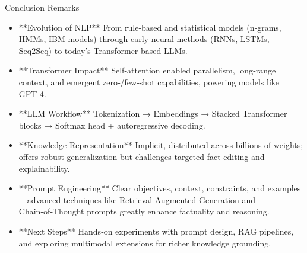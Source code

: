 \documentclass[german,10pt]{beamer}
\begin{document}
\begin{frame}{Conclusion Remarks}
  \begin{itemize}
    \item **Evolution of NLP**  
      From rule‑based and statistical models (n‑grams, HMMs, IBM models) through early neural methods (RNNs, LSTMs, Seq2Seq) to today’s Transformer‑based LLMs.
    \item **Transformer Impact**  
      Self‑attention enabled parallelism, long‑range context, and emergent zero‑/few‑shot capabilities, powering models like GPT‑4.
    \item **LLM Workflow**  
      Tokenization → Embeddings → Stacked Transformer blocks → Softmax head + autoregressive decoding.
    \item **Knowledge Representation**  
      Implicit, distributed across billions of weights; offers robust generalization but challenges targeted fact editing and explainability.
    \item **Prompt Engineering**  
      Clear objectives, context, constraints, and examples—advanced techniques like Retrieval‑Augmented Generation and Chain‑of‑Thought prompts greatly enhance factuality and reasoning.
    \item **Next Steps**  
      Hands‑on experiments with prompt design, RAG pipelines, and exploring multimodal extensions for richer knowledge grounding.
  \end{itemize}
\end{frame}
\end{document}
